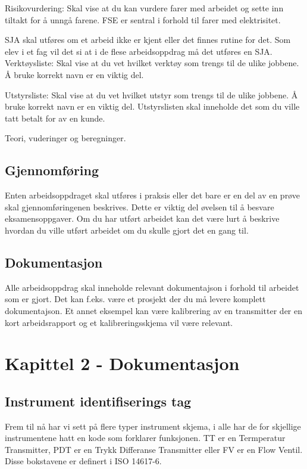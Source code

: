 \documentclass[10pt,a5paper]{article}
\begin{document}
\vskip 5pt 
Risikovurdering:
\vskip 5pt 
Skal vise at du kan vurdere farer med arbeidet og sette inn tiltakt for å unngå farene. FSE er sentral i forhold til farer med elektrisitet. 

\vskip 5pt 
SJA skal utføres om et arbeid ikke er kjent eller det finnes rutine for det. Som elev i et fag vil det si at i de flese arbeidsoppdrag må det utføres en SJA. 
\vskip 5pt 
Verktøysliste:
\vskip 5pt 
Skal vise at du vet hvilket verktøy som trengs til de ulike jobbene. Å bruke korrekt navn er en viktig del. 
\vskip 5pt 

Utstyrsliste:
\vskip 5pt 
Skal vise at du vet hvilket utstyr som trengs til de ulike jobbene. Å bruke korrekt navn er en viktig del. Utstyrslisten skal inneholde det som du ville tatt betalt for av en kunde. 

\vskip 10pt 
Teori, vuderinger og beregninger. 


\vskip 10pt 
\subsection{Gjennomføring}

Enten arbeidsoppdraget skal utføres i praksis eller det bare er en del av en prøve skal gjennomføringenen beskrives. Dette er viktig del øvelsen til å besvare eksamensoppgaver. 
\vskip 5pt 
Om du har utført arbeidet kan det være lurt å beskrive hvordan du ville utført arbeidet om du skulle gjort det en gang til. 
\subsection{Dokumentasjon}

\vskip 5pt 
Alle arbeidsoppdrag skal inneholde relevant dokumentajson i forhold til arbeidet som er gjort. Det kan f.eks. være et prosjekt der du må levere komplett dokumentajson. Et annet eksempel kan være kalibrering av en transmitter der en kort arbeidsrapport og et kalibreringsskjema vil være relevant. 




\vfil \eject
\section{Kapittel 2 - Dokumentasjon}
\subsection{Instrument identifiserings tag} 

Frem til nå har vi sett på flere typer instrument skjema, i alle har de for skjellige instrumentene hatt en kode som forklarer funksjonen. TT er en Termperatur Transmitter, PDT er en Trykk Differanse Transmitter eller FV er en Flow Ventil. Disse bokstavene er definert i ISO 14617-6. 
\end{document}
